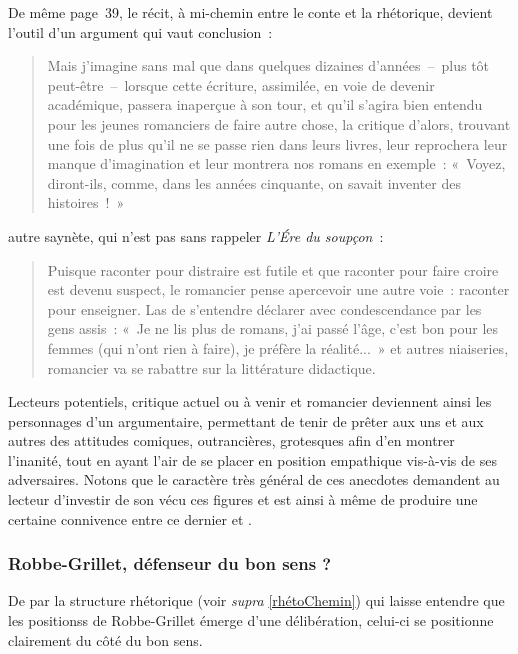 \documentclass[12pt, a4paper]{article}
\begin{document}
De même page~39, le récit, à mi-chemin entre le conte et la rhétorique, devient l'outil d'un argument qui vaut conclusion~:
\begin{quote}
Mais j’imagine sans mal que dans quelques dizaines d’années~–~plus tôt peut-être~–~lorsque cette écriture, assimilée, en voie de devenir académique, passera inaperçue à son tour, et qu’il s’agira bien entendu pour les jeunes romanciers de faire autre chose, la critique d’alors, trouvant une fois de plus qu’il ne se passe rien dans leurs livres, leur reprochera leur manque d’imagination et leur montrera nos romans en exemple~: «~Voyez, diront-ils, comme, dans les années cinquante, on savait inventer des histoires~!~»
\end{quote}
autre saynète, qui n'est pas sans rappeler \textit{L'Ére du soupçon}~:
\begin{quote}
Puisque raconter pour distraire est futile et que raconter pour faire croire est devenu suspect, le romancier pense apercevoir une autre voie~: raconter pour enseigner. Las de s’entendre déclarer avec condescendance par les gens assis~: «~Je ne lis plus de romans, j’ai passé l’âge, c’est bon pour les femmes (qui n’ont rien à faire), je préfère la réalité...~» et autres niaiseries,  romancier va se rabattre sur la littérature didactique.   
\end{quote}
Lecteurs potentiels, critique actuel ou à venir et romancier deviennent ainsi les personnages d'un argumentaire, permettant de tenir de prêter aux uns et aux autres des attitudes comiques, outrancières, grotesques afin d'en montrer l'inanité, tout en ayant l'air de se placer en position empathique vis-à-vis de ses adversaires. Notons que le caractère très général de ces anecdotes demandent au lecteur d'investir de son vécu ces figures et est ainsi à même de produire une certaine connivence entre ce dernier et \robbe. 


\subsubsection{Robbe-Grillet, défenseur du bon sens ?}
\label{bonsens}

De par la structure rhétorique (voir \textit{supra} \ref{rhétoChemin}) qui laisse entendre que les positionss de Robbe-Grillet émerge d'une délibération, celui-ci se positionne clairement du côté du bon sens. 
\end{document}
